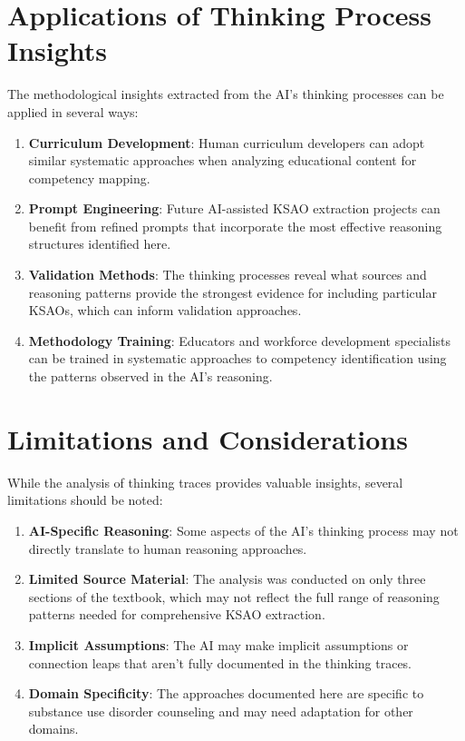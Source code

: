 \documentclass[
  letterpaper,
  DIV=11,
  numbers=noendperiod]{scrartcl}
\begin{document}
\section{Applications of Thinking Process
Insights}\label{applications-of-thinking-process-insights}

The methodological insights extracted from the AI's thinking processes
can be applied in several ways:

\begin{enumerate}
\def\labelenumi{\arabic{enumi}.}
\item
  \textbf{Curriculum Development}: Human curriculum developers can adopt
  similar systematic approaches when analyzing educational content for
  competency mapping.
\item
  \textbf{Prompt Engineering}: Future AI-assisted KSAO extraction
  projects can benefit from refined prompts that incorporate the most
  effective reasoning structures identified here.
\item
  \textbf{Validation Methods}: The thinking processes reveal what
  sources and reasoning patterns provide the strongest evidence for
  including particular KSAOs, which can inform validation approaches.
\item
  \textbf{Methodology Training}: Educators and workforce development
  specialists can be trained in systematic approaches to competency
  identification using the patterns observed in the AI's reasoning.
\end{enumerate}

\section{Limitations and
Considerations}\label{limitations-and-considerations}

While the analysis of thinking traces provides valuable insights,
several limitations should be noted:

\begin{enumerate}
\def\labelenumi{\arabic{enumi}.}
\item
  \textbf{AI-Specific Reasoning}: Some aspects of the AI's thinking
  process may not directly translate to human reasoning approaches.
\item
  \textbf{Limited Source Material}: The analysis was conducted on only
  three sections of the textbook, which may not reflect the full range
  of reasoning patterns needed for comprehensive KSAO extraction.
\item
  \textbf{Implicit Assumptions}: The AI may make implicit assumptions or
  connection leaps that aren't fully documented in the thinking traces.
\item
  \textbf{Domain Specificity}: The approaches documented here are
  specific to substance use disorder counseling and may need adaptation
  for other domains.
\end{enumerate}
\end{document}
